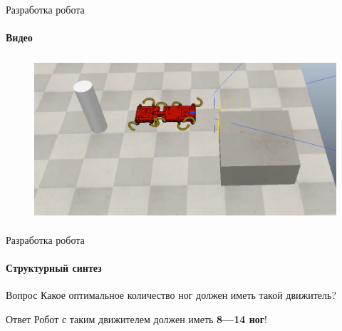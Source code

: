 \documentclass[aspectratio=169,xcolor=table]{beamer}
\begin{document}
\begin{frame}[t]{Разработка робота}
    \framesubtitle{Видео}
    \vspace{-0.6cm}
    \begin{figure}[H]
        \href{run:./videos/sidestep_segments.mp4}{
            \centering\includegraphics[height=6cm,width=1\textwidth,keepaspectratio]{sidestep_segment_video_preview.png}}
    \end{figure}
\end{frame}

\begin{frame}[t]{Разработка робота}
    \framesubtitle{Структурный синтез}
    {\large\begin{block}{Вопрос}
            Какое оптимальное количество ног должен иметь такой движитель?
        \end{block}}
    {\large\begin{alertblock}{Ответ}
            \centering Робот с таким движителем должен иметь \textbf{8---14 ног}!
        \end{alertblock}}
\end{frame}
\end{document}
